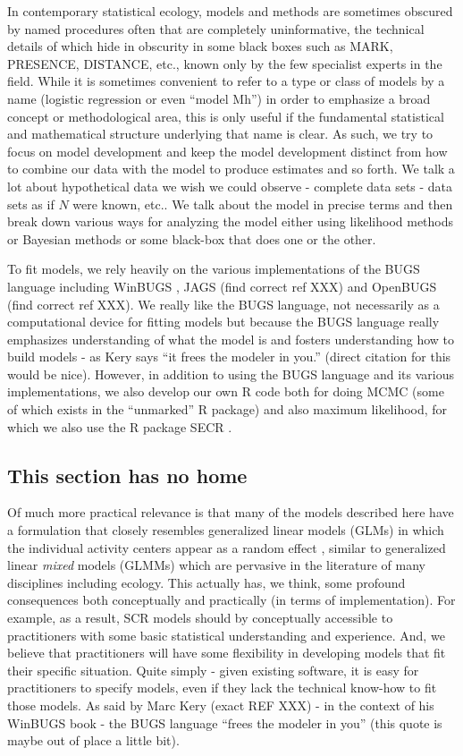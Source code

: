 In contemporary statistical ecology, models and methods are sometimes
obscured by named procedures often that are completely uninformative,
the technical details of which hide in obscurity in some black boxes
such as MARK, PRESENCE, DISTANCE, etc., known only by the few
specialist experts in the field. While it is sometimes convenient to
refer to a type or class of models by a name (logistic regression or
even ``model Mh'') in order to emphasize a broad concept or
methodological area, this is only useful if the fundamental
statistical and mathematical structure underlying that name is
clear. As such, we try to focus on model development and keep the
model development distinct from how to combine our data with the model
to produce estimates and so forth. We talk a lot about hypothetical
data we wish we could observe - complete data sets - data sets as if
$N$ were known, etc.. We talk about the model in precise terms and
then break down various ways for analyzing the model either using
likelihood methods or Bayesian methods or some black-box that does one
or the other.

To fit models, we rely heavily on the various implementations of the
BUGS language including WinBUGS \citep{lunn_etal:2000}, JAGS (find
correct ref XXX) and OpenBUGS (find correct ref XXX). We really like
the BUGS language, not necessarily as a computational device for
fitting models but because the BUGS language really emphasizes
understanding of what the model is and fosters understanding how to
build models - as Kery says ``it frees the modeler in you.''  (direct
citation for this would be nice).  However, in addition to using the
BUGS language and its various implementations, we also develop our own
R code both for doing MCMC (some of which exists in the ``unmarked'' R
package) and also maximum likelihood, for which we also use the R
package SECR \citep{efford:2011}.


\subsection{This section has no home}

Of much more practical relevance is that many of the models described
here have a formulation that closely resembles generalized linear
models (GLMs) in which the individual activity centers appear as a
random effect \citep{royle_etal:2009, royle_gardner:2011}, similar to
generalized linear {\it mixed} models (GLMMs) which are pervasive in
the literature of many disciplines including ecology.  This actually
has, we think, some profound consequences both conceptually and
practically (in terms of implementation). For example, as a result,
SCR models should by conceptually accessible to practitioners with
some basic statistical understanding and experience.  And, we believe
that practitioners will have some flexibility in developing models
that fit their specific situation. Quite simply - given existing
software, it is easy for practitioners to specify models, even if they
lack the technical know-how to fit those models. As said by Marc Kery
(exact REF XXX) - in the context of his WinBUGS book - the BUGS
language ``frees the modeler in you'' (this quote is maybe out of
place a little bit).



